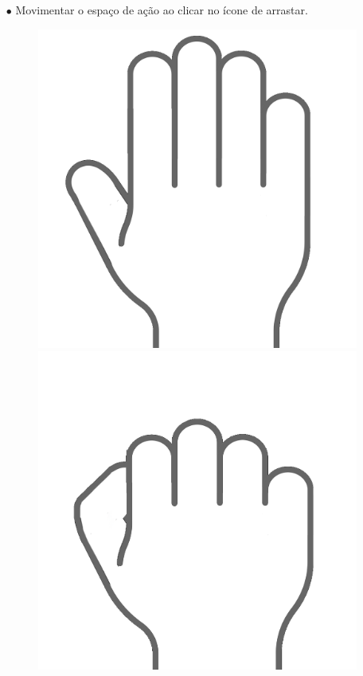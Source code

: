 \begin{itemize}
    \item[$\bullet$]
        Movimentar o espaço de ação ao clicar no ícone de arrastar.
        \begin{figure}[H]
            \centering
            \begin{minipage}{.4\textwidth}
              \centering
              \includegraphics[scale=0.1]{../figuras/open_hand_icon.png}
            \end{minipage}%
            \begin{minipage}{.4\textwidth}
              \centering
              \includegraphics[scale=0.1]{../figuras/closed_hand_icon.png}

\end{minipage}
\end{figure}
\end{itemize}
